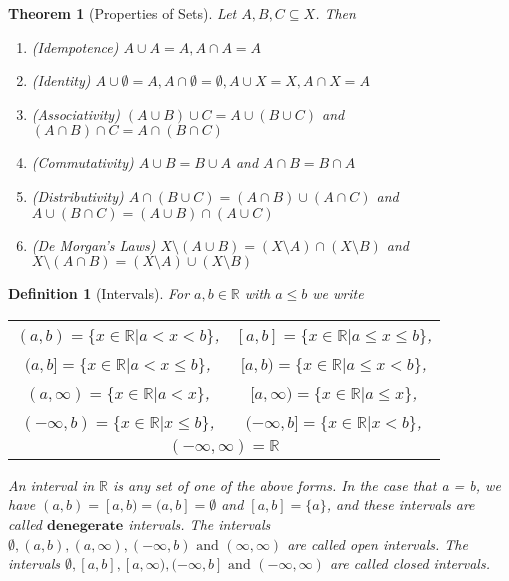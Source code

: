 \documentclass[11pt, oneside]{book}
\theoremstyle{break}
\newtheorem{thm}{Theorem}[section]
\newtheorem{defn}{Definition}[section]
\newcommand{\bb}[1]{\mathbb{#1}}			%
\begin{document}
\begin{thm}[Properties of Sets]
	Let $A, B, C \subseteq X$. Then
	\begin{enumerate}
		\item (Idempotence) $A \cup A = A, A \cap A = A$
		\item (Identity) $A \cup \emptyset = A, A \cap \emptyset = \emptyset, A \cup X = X, A \cap X = A$
		\item (Associativity) $(A \cup B) \cup C = A \cup (B \cup C)$ and $(A \cap B) \cap C = A \cap (B \cap C)$
		\item (Commutativity) $A \cup B = B \cup A$ and $A \cap B = B \cap A$
		\item (Distributivity) $A \cap (B \cup C) = (A \cap B) \cup (A \cap C)$ and $A \cup (B \cap C) = (A \cup B) \cap (A \cup C)$
		\item (De Morgan's Laws) $X \setminus (A \cup B) = (X \setminus A) \cap (X \setminus B)$ and $X \setminus (A \cap B) = (X \setminus A) \cup (X \setminus B)$
	\end{enumerate}
\end{thm}

\begin{defn}[Intervals]
	For $a, b \in \bb{R}$ with $a \leq b$ we write
	\begin{center}
		\begin{tabular}{c c}
			$(a, b) = \{x \in \bb{R} | a < x < b\}$,	&	$[a, b] = \{x \in \bb{R} | a \leq x \leq b \}$,\\
			$(a, b] = \{x \in \bb{R} | a < x \leq b \}$,	&	$[a, b) = \{x \in \bb{R} | a \leq x < b \}$,\\
			$(a, \infty) = \{x \in \bb{R} | a < x \}$,	&	$[a, \infty) = \{x \in \bb{R} | a \leq x\}$,\\
			$(-\infty, b) = \{x \in \bb{R} | x \leq b\}$,	&	$(-\infty, b] = \{x \in \bb{R} | x < b\}$,\\
			\multicolumn{2}{c}{$(-\infty, \infty) = \bb{R}$}
		\end{tabular}
	\end{center}

	An interval in $\bb{R}$ is any set of one of the above forms. In the case that a = b, we have $(a, b) = [a, b) = (a, b] = \emptyset$ and $[a, b] = \{a\}$, and these intervals are called $\textbf{denegerate}$ intervals. The intervals $\emptyset, (a, b), (a, \infty), (-\infty, b) \text{ and } (\infty, \infty)$ are called open intervals. The intervals $\emptyset, [a, b], [a, \infty), (-\infty, b] \text{ and } (-\infty, \infty)$ are called closed intervals.
\end{defn}
\end{document}
